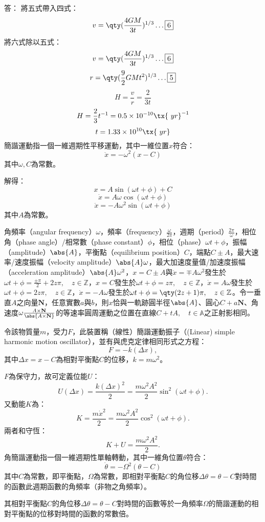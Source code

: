 \documentclass[a4paper,12pt]{article}
\begin{document}
答： 將五式帶入四式：
\[v=\qty(\frac{4GM}{3t})^{1/3}\ldots\boxed{6}\]
將六式除以五式：
\[v=\qty(\frac{4GM}{3t})^{1/3}\ldots\boxed{6}\]
\[r=\qty(\frac{9}{2}GMt^2)^{1/3}\ldots\boxed{5}\]
\[H=\frac{v}{r}=\frac{2}{3t}\]
\[H=\frac{2}{3}t^{-1}=0.5\times 10^{-10}\tx{\ yr}^{-1}\]
\[t=1.33\times 10^{10}\tx{\ yr}\]
簡諧運動指一個一維週期性平移運動，其中一維位置$x$符合：
\[\ddot{x}=-\omega^2(x-C)\]
其中$\omega,C$為常數。

解得：
\[x=A\sin(\omega t+\phi)+C\]
\[\dot{x}=A\omega\cos(\omega t+\phi)\]
\[\ddot{x}=-A\omega^2\sin(\omega t+\phi)\]
其中$A$為常數。

角頻率（angular frequency）$\omega$，頻率（frequency）$\frac{\omega}{2\pi}$，週期（period）$\frac{2\pi}{\omega}$，相位角（phase angle）/相常數（phase constant）$\phi$，相位（phase）$\omega t+\phi$，振幅（amplitude）$\abs{A}$，平衡點（equilibrium position）$C$，端點$C\pm A$，最大速率/速度振幅（velocity amplitude）$\abs{A}\omega$，最大加速度量值/加速度振幅（acceleration amplitude）$\abs{A}\omega^2$，$x=C\pm A$與$\ddot{x}=\mp A\omega^2$發生於$\omega t+\phi=\frac{\pm\pi}{2}+2z\pi,\quad z\in\mathbb{Z}$，$x=C$發生於$\omega t+\phi=z\pi,\quad z\in\mathbb{Z}$，$\dot{x}=A\omega$發生於$\omega t+\phi=2z\pi,\quad z\in\mathbb{Z}$，$\dot{x}=-A\omega$發生於$\omega t+\phi=\qty(2z+1)\pi,\quad z\in\mathbb{Z}$。令一垂直$A$之向量$\mathbf{N}$，任意實數$a$與$b$，則$x$恰與一軌跡圓半徑$\abs{A}$、圓心$C+a\mathbf{N}$、角速度$\omega\frac{A\times\mathbf{N}}{\abs{A\times\mathbf{N}}}$的等速率圓周運動之位置在直線$C+tA,\quad t\in\mathbb{A}$之正射影相同。

令該物質量$m$，受力$F$，此裝置稱（線性）簡諧運動振子（(Linear) simple harmonic motion oscillator），並有與虎克定律相同形式之方程：
\[F=-k(\Delta x),\]
其中$\Delta x=x-C$為相對平衡點$C$的位移，$k=m\omega^2$。

$F$為保守力，故可定義位能$U$：
\[U(\Delta x)=\frac{k(\Delta x)^2}{2}=\frac{m\omega^2A^2}{2}\sin^2(\omega t+\phi).\]
又動能$K$為：
\[K=\frac{m\dot{x}^2}{2}=\frac{m\omega^2A^2}{2}\cos^2(\omega t+\phi).\]
兩者和守恆：
\[K+U=\frac{m\omega^2A^2}{2}.\]
角簡諧運動指一個一維週期性單軸轉動，其中一維角位置$\theta$符合：
\[\ddot{\theta}=-\Omega^2(\theta-C)\]
其中$C$為常數，即平衡點，$\Omega$為常數，即相對平衡點$C$的角位移$\Delta \theta=\theta-C$對時間的函數此週期函數的角頻率（非物之角頻率）。

其相對平衡點$C$的角位移$\Delta \theta=\theta-C$對時間的函數等於一角頻率$\Omega$的簡諧運動的相對平衡點的位移對時間的函數的常數倍。
\end{document}
